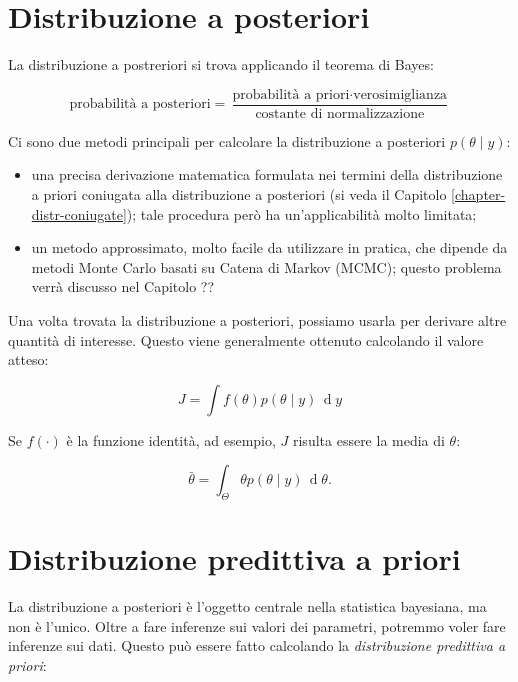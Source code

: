 \documentclass[
  11pt,
]{krantz}
\theoremstyle{definition}
\theoremstyle{definition}
\theoremstyle{definition}
\theoremstyle{definition}
\theoremstyle{remark}
\begin{document}
\hypertarget{distribuzione-a-posteriori}{%
\section{Distribuzione a posteriori}\label{distribuzione-a-posteriori}}

La distribuzione a postreriori si trova applicando il teorema di Bayes:

\[
\text{probabilità a posteriori} = \frac{\text{probabilità a priori} \cdot \text{verosimiglianza}}{\text{costante di normalizzazione}}
\]

Ci sono due metodi principali per calcolare la distribuzione a posteriori \(p(\theta \mid y)\):

\begin{itemize}
\item
  una precisa derivazione matematica formulata nei termini della distribuzione a priori coniugata alla distribuzione a posteriori (si veda il Capitolo \ref{chapter-distr-coniugate}); tale procedura però ha un'applicabilità molto limitata;
\item
  un metodo approssimato, molto facile da utilizzare in pratica, che dipende da metodi Monte Carlo basati su Catena di Markov (MCMC); questo problema verrà discusso nel Capitolo ??
\end{itemize}

Una volta trovata la distribuzione a posteriori, possiamo usarla per derivare altre quantità di interesse. Questo viene generalmente ottenuto calcolando il valore atteso:

\[
J = \int f(\theta) p(\theta \mid y) \,\operatorname {d}\!y
\]

Se \(f(\cdot)\) è la funzione identità, ad esempio, \(J\) risulta essere la media di \(\theta\):

\[
\bar{\theta} = \int_{\Theta} \theta p(\theta \mid y) \,\operatorname {d}\!\theta .
\]

\hypertarget{distribuzione-predittiva-a-priori}{%
\section{Distribuzione predittiva a priori}\label{distribuzione-predittiva-a-priori}}

La distribuzione a posteriori è l'oggetto centrale nella statistica bayesiana, ma non è l'unico. Oltre a fare inferenze sui valori dei parametri, potremmo voler fare inferenze sui dati. Questo può essere fatto calcolando la \emph{distribuzione predittiva a priori}:
\end{document}
